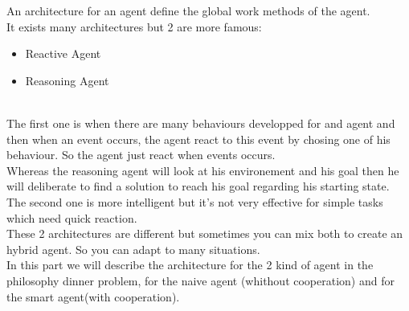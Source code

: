 An architecture for an agent define the global work methods of the agent.\\
It exists many architectures but 2 are more famous:\\
\begin{itemize}
	\item Reactive Agent
	\item Reasoning Agent
\end{itemize}\\
The first one is when there are many behaviours developped for and agent and then when an event occurs, the agent react to this event by chosing one of his behaviour. So the agent just react when events occurs.\\
Whereas the reasoning agent will look at his environement and his goal then he will deliberate to find a solution to reach his goal regarding his starting state.\\
The second one is more intelligent but it's not very effective for simple tasks which need quick reaction.\\
These 2 architectures are different but sometimes you can mix both to create an hybrid agent. So you can adapt to many situations.\\
In this part we will describe the architecture for the 2 kind of agent in the philosophy dinner problem, for the naive agent (whithout cooperation) and for the smart agent(with cooperation).

